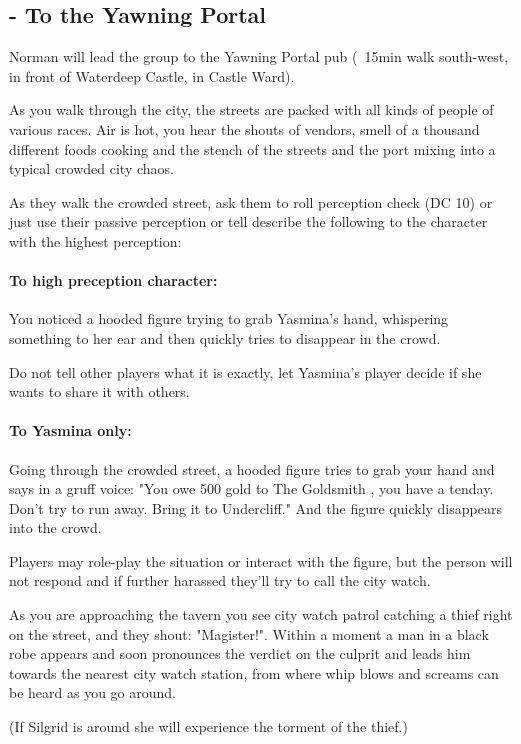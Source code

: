 \documentclass[10pt,onecolumn,twoside,openany,bg=full,layout=true]{dndbook}
\begin{document}
\subsection{ - To the Yawning Portal}\label{subsec:\arabic{subact_num}-to-the-yawning-portal}
\addtocounter{subact_num}{1}
Norman will lead the group to the Yawning Portal pub (~15min walk south-west, in front of Waterdeep Castle, in Castle Ward).
\begin{DndReadAloud}
As you walk through the city, the streets are packed with all kinds of people of various races.
Air is hot, you hear the shouts of vendors, smell of a thousand different foods cooking and the stench of the streets and the port mixing into a typical crowded city chaos.
\end{DndReadAloud}

As they walk the crowded street, ask them to roll perception check (DC 10) or just use their passive perception or
tell describe the following to the character with the highest perception:
\begin{DndReadAloud}
\paragraph{ To high preception character: }
  You noticed a hooded figure trying to grab Yasmina's hand, whispering something to her ear and then quickly tries to disappear in the crowd.
\end{DndReadAloud}
Do not tell other players what it is exactly, let Yasmina's player decide if she wants to share it with others.
\begin{DndReadAloud}
\paragraph{ To Yasmina only:}
Going through the crowded street, a hooded figure tries to grab your hand and says in a gruff voice:
"You owe 500 gold to The Goldsmith , you have a tenday.
  Don't try to run away.
  Bring it to Undercliff."
  And the figure quickly disappears into the crowd.
\end{DndReadAloud}
Players may role-play the situation or interact with the figure, but the person will not respond and if further harassed they'll try to call the city watch.

\begin{DndReadAloud}
As you are approaching the tavern you see city watch patrol catching a thief right on the street, and they shout: "Magister!".
Within a moment a man in a black robe appears and soon pronounces the verdict on the culprit and leads him towards the
nearest city watch station, from where whip blows and screams can be heard as you go around.
\end{DndReadAloud}
(If Silgrid is around she will experience the torment of the thief.)
\end{document}
